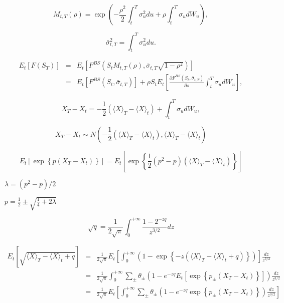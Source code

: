\documentclass[12pt]{article}
\begin{document}
  \begin{equation}
    M_{t,T}(\rho) = \exp\left(-\frac{\rho^2}{2}\int_t^T\sigma_u^2du+\rho\int_t^T\sigma_udW_u\right),
  \end{equation}

  \begin{equation}
    \bar\sigma_{t,T}^2=\int_t^T\sigma_u^2du.
  \end{equation}

  \begin{eqnarray}
           E_t\left[F(S_T)\right]
    &=&E_t\left[F^{BS}\left(S_tM_{t,T}(\rho),\bar\sigma_{t,T}\sqrt{1-\rho^2}\right)\right]\nonumber\\
    &=&E_t\left[F^{BS}(S_t,\bar\sigma_{t,T})\right]
              + \rho S_tE_t\left[\frac{\partial F^{BS}(S_t,\bar\sigma_{t,T})}{\partial s}\int_t^T\sigma_udW_u\right],
  \end{eqnarray}

  \begin{equation}
    X_T-X_t=-\frac{1}{2}\left(\langle X \rangle_T - \langle X \rangle_t\right) + \int_t^T\sigma_udW_u,
  \end{equation}

  \begin{equation}
    X_T-X_t\sim N\left(-\frac{1}{2}\left(\langle X \rangle_T - \langle X \rangle_t\right), \langle X \rangle_T - \langle X \rangle_t\right)
  \end{equation}

  \begin{equation}
    E_t\left[\exp\left\{p\left(X_T-X_t\right)\right\}\right] = E_t\left[\exp\left\{\frac{1}{2}\left(p^2-p\right)\left(\langle X \rangle_T - \langle X \rangle_t\right)\right\}\right]
  \end{equation}

  $\lambda=(p^2-p)/2$

  $p=\frac{1}{2}\pm\sqrt{\frac{1}{4}+2\lambda}$


  \begin{equation}
    \sqrt{q} = \frac{1}{2\sqrt{\pi}}\int_0^{+\infty}\frac{1-2^{-zq}}{z^{3/2}}dz
  \end{equation}

  \begin{eqnarray}
                      E_t\left[\sqrt{\langle X \rangle_T - \langle X \rangle_t+q}\right]
    &=&\frac{1}{2\sqrt{\pi}}E_t\left[\int_0^{+\infty}\left(1-\exp\left\{-z\left(\langle X \rangle_T - \langle X \rangle_t+q\right)\right\}\right)\right]\frac{dz}{z^{3/2}}\nonumber\\
    &=&\frac{1}{2\sqrt{\pi}}\int_0^{+\infty}\sum_{\pm}\theta_{\pm}\left(1-e^{-zq}E_t\left[\exp\left\{p_{\pm}\left(X_T-X_t\right)\right\}\right]\right)\frac{dz}{z^{3/2}}\nonumber\\
    &=&\frac{1}{2\sqrt{\pi}}E_t\left[\int_0^{+\infty}\sum_{\pm}\theta_{\pm}\left(1-e^{-zq}\exp\left\{p_{\pm}\left(X_T-X_t\right)\right\}\right)\frac{dz}{z^{3/2}}\right]
  \end{eqnarray}
\end{document}
